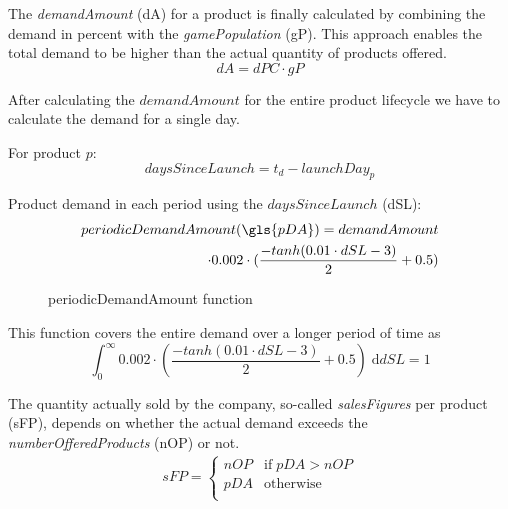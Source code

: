 The \textit{demandAmount} (\gls{dA}) for a product is finally calculated by combining the demand in percent with the \textit{gamePopulation} (\gls{gP}). This approach enables the total demand to be higher than the actual quantity of products offered.
\begin{equation}
\label{func:demandAmount}
dA = dPC \cdot gP    
\end{equation}

After calculating the $demandAmount$ for the entire product lifecycle we have to calculate the demand for a single day.

For product $p$:
\begin{equation}
	daysSinceLaunch = t_d -launchDay_{p}
\end{equation}

Product demand in each period using the $daysSinceLaunch$ (\gls{dSL}):
\begin{equation}
\begin{aligned}
periodicDemandAmount(\gls{pDA}) = demandAmount\\ 
\cdot 0.002\cdot (\frac{-tanh(0.01 \cdot dSL-3)}{2} + 0.5)
\end{aligned}
\end{equation}

\begin{figure}[h]
\centering
{}
	\caption{periodicDemandAmount function}
	\label{periodicDemandAmount_function}
\end{figure}


This function covers the entire demand over a longer period of time as
\begin{equation}
	\int_{0}^{\infty} 0.002 \cdot (\frac{-tanh(0.01 \cdot dSL-3)}{2} + 0.5)\; \mathrm{d} dSL = 1  
\end{equation}

The quantity actually sold by the company, so-called \textit{salesFigures} per product (\gls{sFP}), depends on whether the actual demand exceeds the \textit{numberOfferedProducts} (\gls{nOP}) or not.
\begin{equation}
\label{func:salesFigure}
\begin{aligned}
sFP = 
\begin{cases}
     nOP & \text{if} \; pDA > nOP\\
     pDA & \text{otherwise} \\
\end{cases}
\end{aligned}
\end{equation}


